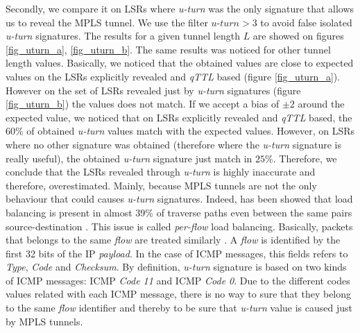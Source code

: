 Secondly, we compare it on LSRs where \textit{u-turn} was the only
signature that allows us to reveal the MPLS tunnel. We use the filter $\textit{u-turn}>3$ to
avoid false isolated \textit{u-turn} signatures. The results for a given tunnel length $L$ are showed on figures
\ref{fig_uturn_a}, \ref{fig_uturn_b}. The same results was noticed for other tunnel length values. Basically, we noticed that the obtained values are close to expected values on the LSRs explicitly revealed  and \textit{qTTL} based (figure \ref{fig_uturn_a}). However on the set of  LSRs revealed just by \textit{u-turn} signatures (figure \ref{fig_uturn_b}) the values does not match. If we accept a bias of $ \pm 2$ around the expected value, we
noticed that  on LSRs explicitly revealed  and \textit{qTTL} based, the $60\%$ of obtained \textit{u-turn} values match
with the expected values. However, on LSRs
where no other signature was obtained (therefore where the \textit{u-turn} signature
is really useful), the obtained \textit{u-turn} signature just match in $25\%$. 
Therefore, we conclude that the LSRs revealed through \textit{u-turn} is highly inaccurate and therefore, overestimated. Mainly, because MPLS tunnels are not the
only behaviour that could causes \textit{u-turn} signatures. Indeed, has been showed that load balancing is present in almost $39\%$ of traverse paths even between the same pairs source-destination \cite{BRICE07}. This issue is called \textit{per-flow} load balancing. Basically, packets that belongs to the same \textit{flow} are treated similarly \cite{BRICE06}. A \textit{flow} is identified by the first 32 bits of the IP \textit{payload}. In the case of ICMP messages, this fields refers to \textit{Type},
\textit{Code} and \textit{Checksum}. By definition, \textit{u-turn} signature is
based on two kinds of ICMP messages: ICMP \echoreply \textit{Code 11} and ICMP
\ttlexceeded \textit{Code 0}. Due to the different codes values
related with each ICMP message, there is no way to sure that they belong to the same \textit{flow} identifier and thereby to be sure that \textit{u-turn} value is caused just by MPLS tunnels.
